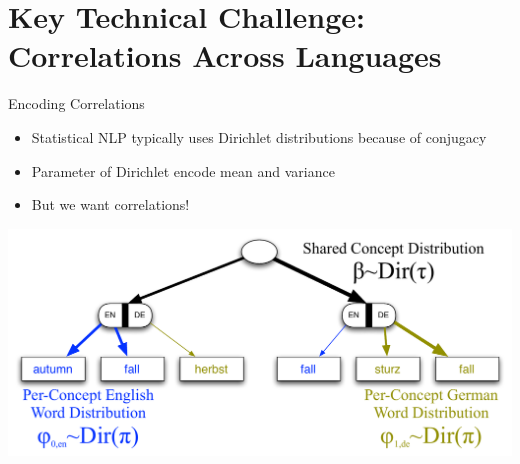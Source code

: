 
\section{Key Technical Challenge: Correlations Across Languages}



\ifhighlevel

\begin{frame}{Encoding Correlations}

  \begin{itemize}
    \item Statistical NLP typically uses Dirichlet distributions because of conjugacy
   \item Parameter of Dirichlet encode mean and variance
    \pause
    \item But we want correlations!
      \end{itemize}

\begin{center}
  \includegraphics[width=0.85\linewidth]{mlslda/correlations_3}
\end{center}

\end{frame}

